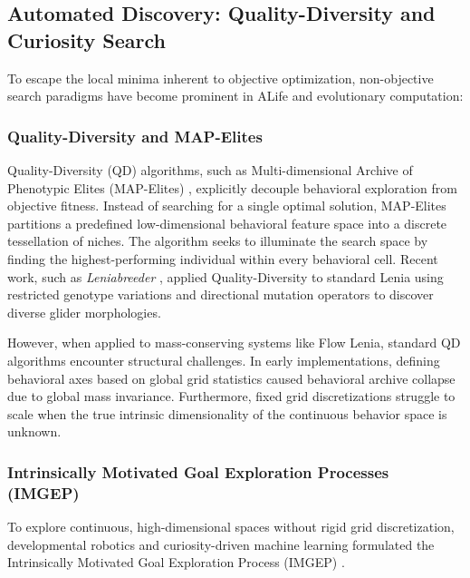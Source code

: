 \subsection{Automated Discovery: Quality-Diversity and Curiosity Search}
\label{subsec:bg_automated_discovery}

To escape the local minima inherent to objective optimization, non-objective search paradigms have become prominent in ALife and evolutionary computation:

\subsubsection{Quality-Diversity and MAP-Elites}
Quality-Diversity (QD) algorithms, such as Multi-dimensional Archive of Phenotypic Elites (MAP-Elites) \parencite{mouret2015illuminating}, explicitly decouple behavioral exploration from objective fitness. Instead of searching for a single optimal solution, MAP-Elites partitions a predefined low-dimensional behavioral feature space into a discrete tessellation of niches. The algorithm seeks to illuminate the search space by finding the highest-performing individual within every behavioral cell. Recent work, such as \textit{Leniabreeder} \parencite{faldor2024leniabreeder}, applied Quality-Diversity to standard Lenia using restricted genotype variations and directional mutation operators to discover diverse glider morphologies.

However, when applied to mass-conserving systems like Flow Lenia, standard QD algorithms encounter structural challenges. In early implementations, defining behavioral axes based on global grid statistics caused behavioral archive collapse due to global mass invariance. Furthermore, fixed grid discretizations struggle to scale when the true intrinsic dimensionality of the continuous behavior space is unknown.

\subsubsection{Intrinsically Motivated Goal Exploration Processes (IMGEP)}
To explore continuous, high-dimensional spaces without rigid grid discretization, developmental robotics and curiosity-driven machine learning formulated the Intrinsically Motivated Goal Exploration Process (IMGEP) \parencite{oudeyer2007intrinsic}. 

